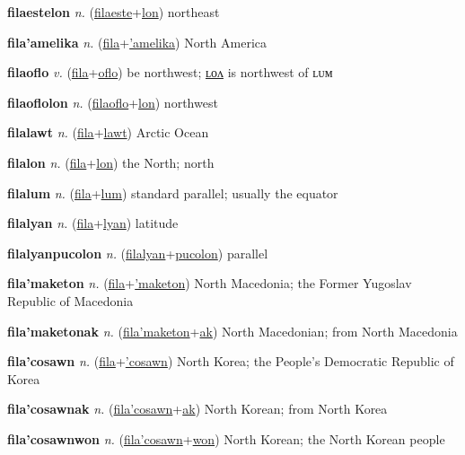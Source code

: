 \textbf{\hypertarget{filaestelon}{filaestelon}} \textit{n.} (\hyperlink{filaeste}{filaeste}+\allowbreak \hyperlink{lon}{lon})
northeast

\textbf{\hypertarget{fila'amelika}{fila'amelika}} \textit{n.} (\hyperlink{fila}{fila}+\allowbreak \hyperlink{'amelika}{'amelika})
North America

\textbf{\hypertarget{filaoflo}{filaoflo}} \textit{v.} (\hyperlink{fila}{fila}+\allowbreak \hyperlink{oflo}{oflo})
be northwest; \hyperlink{filaoflolon}{ʟᴏᴧ} is northwest of ʟᴜᴍ

\textbf{\hypertarget{filaoflolon}{filaoflolon}} \textit{n.} (\hyperlink{filaoflo}{filaoflo}+\allowbreak \hyperlink{lon}{lon})
northwest

\textbf{\hypertarget{filalawt}{filalawt}} \textit{n.} (\hyperlink{fila}{fila}+\allowbreak \hyperlink{lawt}{lawt})
Arctic Ocean

\textbf{\hypertarget{filalon}{filalon}} \textit{n.} (\hyperlink{fila}{fila}+\allowbreak \hyperlink{lon}{lon})
the North; north

\textbf{\hypertarget{filalum}{filalum}} \textit{n.} (\hyperlink{fila}{fila}+\allowbreak \hyperlink{lum}{lum})
standard parallel; usually the equator

\textbf{\hypertarget{filalyan}{filalyan}} \textit{n.} (\hyperlink{fila}{fila}+\allowbreak \hyperlink{lyan}{lyan})
latitude

\textbf{\hypertarget{filalyanpucolon}{filalyanpucolon}} \textit{n.} (\hyperlink{filalyan}{filalyan}+\allowbreak \hyperlink{pucolon}{pucolon})
parallel

\textbf{\hypertarget{fila'maketon}{fila'maketon}} \textit{n.} (\hyperlink{fila}{fila}+\allowbreak \hyperlink{'maketon}{'maketon})
North Macedonia; the Former Yugoslav Republic of Macedonia

\textbf{\hypertarget{fila'maketonak}{fila'maketonak}} \textit{n.} (\hyperlink{fila'maketon}{fila'maketon}+\allowbreak \hyperlink{ak}{ak})
North Macedonian; from North Macedonia

\textbf{\hypertarget{fila'cosawn}{fila'cosawn}} \textit{n.} (\hyperlink{fila}{fila}+\allowbreak \hyperlink{'cosawn}{'cosawn})
North Korea; the People’s Democratic Republic of Korea

\textbf{\hypertarget{fila'cosawnak}{fila'cosawnak}} \textit{n.} (\hyperlink{fila'cosawn}{fila'cosawn}+\allowbreak \hyperlink{ak}{ak})
North Korean; from North Korea

\textbf{\hypertarget{fila'cosawnwon}{fila'cosawnwon}} \textit{n.} (\hyperlink{fila'cosawn}{fila'cosawn}+\allowbreak \hyperlink{won}{won})
North Korean; the North Korean people

